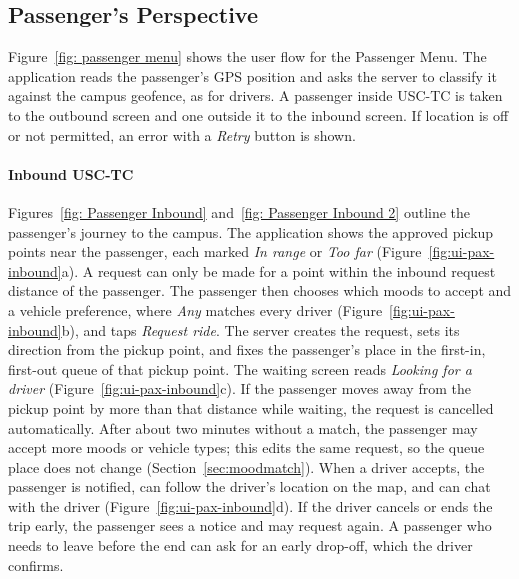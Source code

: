 \subsection{Passenger's Perspective}
\label{sec:flow-passenger}
Figure~\ref{fig: passenger menu} shows the user flow for the Passenger Menu. The application reads the passenger's GPS position and asks the server to classify it against the campus geofence, as for drivers. A passenger inside USC-TC is taken to the outbound screen and one outside it to the inbound screen. If location is off or not permitted, an error with a \emph{Retry} button is shown.


\paragraph{Inbound USC-TC} Figures~\ref{fig: Passenger Inbound} and~\ref{fig: Passenger Inbound 2} outline the passenger's journey to the campus. The application shows the approved pickup points near the passenger, each marked \emph{In range} or \emph{Too far} (Figure~\ref{fig:ui-pax-inbound}a). A request can only be made for a point within the inbound request distance of the passenger. The passenger then chooses which moods to accept and a vehicle preference, where \emph{Any} matches every driver (Figure~\ref{fig:ui-pax-inbound}b), and taps \emph{Request ride}. The server creates the request, sets its direction from the pickup point, and fixes the passenger's place in the first-in, first-out queue of that pickup point. The waiting screen reads \emph{Looking for a driver} (Figure~\ref{fig:ui-pax-inbound}c). If the passenger moves away from the pickup point by more than that distance while waiting, the request is cancelled automatically. After about two minutes without a match, the passenger may accept more moods or vehicle types; this edits the same request, so the queue place does not change (Section~\ref{sec:moodmatch}). When a driver accepts, the passenger is notified, can follow the driver's location on the map, and can chat with the driver (Figure~\ref{fig:ui-pax-inbound}d). If the driver cancels or ends the trip early, the passenger sees a notice and may request again. A passenger who needs to leave before the end can ask for an early drop-off, which the driver confirms.


